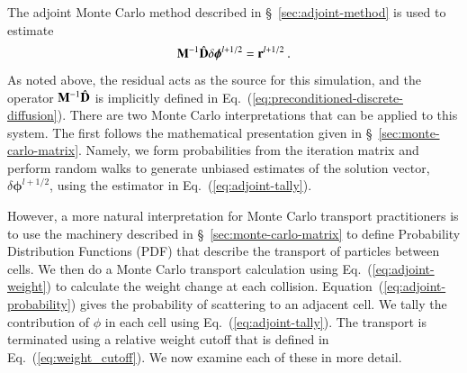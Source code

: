 \documentclass[preprint,12pt]{elsarticle}
\newcommand{\vr}{\ensuremath{\ve{r}}}
\newcommand{\bphi}{\ensuremath{\boldsymbol{\phi}}}
\begin{document}
The adjoint Monte Carlo method described in \S~\ref{sec:adjoint-method} is
used to estimate
\begin{equation}
  \ve{M}^{-1}\hat{\ve{D}}\delta\bphi^{l+1/2} = \vr^{l+1/2}\:.
\end{equation}
As noted above, the residual acts as the source for this simulation, and the
operator $\mathbf{M}^{-1}\hat{\mathbf{D}}$ is implicitly defined in
Eq.~(\ref{eq:preconditioned-discrete-diffusion}).  There are two Monte Carlo
interpretations that can be applied to this system.  The first follows the
mathematical presentation given in \S~\ref{sec:monte-carlo-matrix}.  Namely,
we form probabilities from the iteration matrix and perform random walks to
generate unbiased estimates of the solution vector, $\delta\bphi^{l+1/2}$,
using the estimator in Eq.~(\ref{eq:adjoint-tally}).

However, a more natural interpretation for Monte Carlo transport practitioners
is to use the machinery described in \S~\ref{sec:monte-carlo-matrix} to define
Probability Distribution Functions (PDF) that describe the transport of
particles between cells.  We then do a Monte Carlo transport calculation using
Eq.~(\ref{eq:adjoint-weight}) to calculate the weight change at each
collision. Equation~(\ref{eq:adjoint-probability}) gives the probability of
scattering to an adjacent cell. We tally the contribution of $\phi$ in each
cell using Eq.~(\ref{eq:adjoint-tally}).  The transport is terminated using a
relative weight cutoff that is defined in Eq.~(\ref{eq:weight_cutoff}).  We
now examine each of these in more detail.
\end{document}
